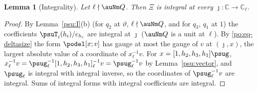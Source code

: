 \documentclass[10pt]{amsart}
\newtheorem{lemma}[theorem]{Lemma}
\theoremstyle{definition}
\theoremstyle{remark}
\newcommand{\C}{\mathbb C}
\begin{document}
\begin{lemma}[Integrality]\label{psu:integral}
Let $\ell\nmid\auNm Q$. Then $\Xi$ is integral at every $\jmath\colon\C\to\C_\ell$.
\end{lemma}
\begin{proof}
By Lemma~\ref{psu:I}(b) (for $q_2$ at $\vartheta$, $\ell\nmid\auNm Q$, and for $q_3$, $q_1$ at $1$) the
coefficients $\psuT_i(h_i)/e_{h_i}$ are integral at $\jmath$ ($\auNm Q$ is a unit at $\ell$). By
\eqref{po:eq-deltasize} the form $\podel[x;v]$ has gauge at most the gauge of $v$ at $(\jmath,x)$, the
largest absolute value of a coordinate of $x_\ell^{-1}v$. For $x=[1,h_2,h_3,h_1]\psug$,
$x_\ell^{-1}v=\psug_\ell^{-1}[1,h_2,h_3,h_1]_\ell^{-1}v=\psug_\ell^{-1}v$ by Lemma~\ref{psu:vector}, and
$\psug_\ell$ is integral with integral inverse, so the coordinates of $\psug_\ell^{-1}v$ are integral.
Sums of integral forms with integral coefficients are integral.
\end{proof}
\end{document}
